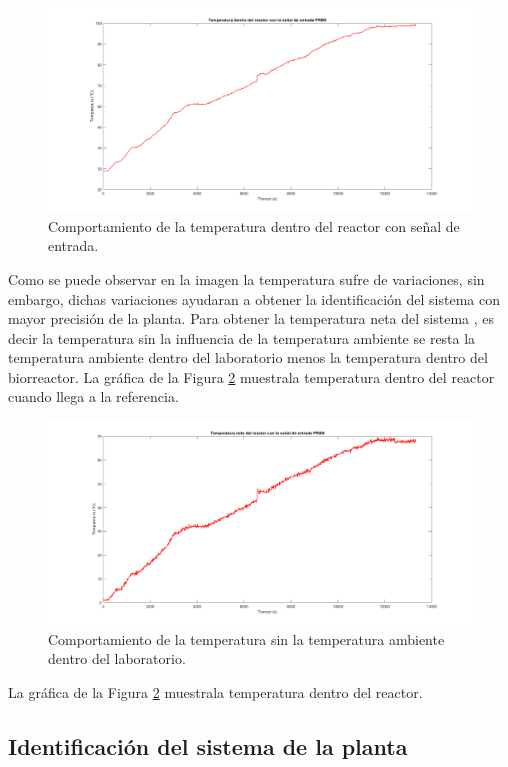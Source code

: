 \documentclass[12pt]{article}
\begin{document}
	\begin{figure}[H]
		\centering
		\includegraphics[width=.8\linewidth]{imagenes/temperatura con prbs}
		\caption{Comportamiento de la temperatura dentro del reactor con señal de entrada. }
		\label{ Temperatura_con PRBS}
	\end{figure}
	
	
	Como se puede observar en la imagen la temperatura sufre de variaciones,  sin embargo, dichas variaciones ayudaran a obtener la identificación del sistema con mayor precisión de la planta.
	Para obtener la temperatura neta del sistema , es decir la temperatura sin la influencia de la temperatura ambiente se resta la temperatura ambiente dentro del laboratorio menos la temperatura dentro del biorreactor.	La gráfica de la Figura \ref{ Temperatura neta_con PRBS} muestrala temperatura dentro del reactor cuando llega a la referencia.
	
	\begin{figure}[H]
		\centering
		\includegraphics[width=.7\linewidth]{imagenes/temp_neta}
		\caption{Comportamiento de la temperatura sin la temperatura ambiente dentro del laboratorio. }
		\label{ Temperatura neta_con PRBS}
	\end{figure}
	
	La gráfica de la Figura \ref{ Temperatura neta_con PRBS} muestrala temperatura dentro del reactor.
	
	
	
	\subsection{Identificación del sistema de la planta}	
	
\end{document}
